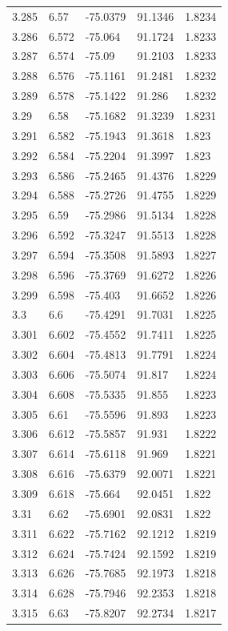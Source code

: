 \begin{tabular}{lllll}
3.285 & 6.57 & -75.0379 & 91.1346 & 1.8234 \\
3.286 & 6.572 & -75.064 & 91.1724 & 1.8233 \\
3.287 & 6.574 & -75.09 & 91.2103 & 1.8233 \\
3.288 & 6.576 & -75.1161 & 91.2481 & 1.8232 \\
3.289 & 6.578 & -75.1422 & 91.286 & 1.8232 \\
3.29 & 6.58 & -75.1682 & 91.3239 & 1.8231 \\
3.291 & 6.582 & -75.1943 & 91.3618 & 1.823 \\
3.292 & 6.584 & -75.2204 & 91.3997 & 1.823 \\
3.293 & 6.586 & -75.2465 & 91.4376 & 1.8229 \\
3.294 & 6.588 & -75.2726 & 91.4755 & 1.8229 \\
3.295 & 6.59 & -75.2986 & 91.5134 & 1.8228 \\
3.296 & 6.592 & -75.3247 & 91.5513 & 1.8228 \\
3.297 & 6.594 & -75.3508 & 91.5893 & 1.8227 \\
3.298 & 6.596 & -75.3769 & 91.6272 & 1.8226 \\
3.299 & 6.598 & -75.403 & 91.6652 & 1.8226 \\
3.3 & 6.6 & -75.4291 & 91.7031 & 1.8225 \\
3.301 & 6.602 & -75.4552 & 91.7411 & 1.8225 \\
3.302 & 6.604 & -75.4813 & 91.7791 & 1.8224 \\
3.303 & 6.606 & -75.5074 & 91.817 & 1.8224 \\
3.304 & 6.608 & -75.5335 & 91.855 & 1.8223 \\
3.305 & 6.61 & -75.5596 & 91.893 & 1.8223 \\
3.306 & 6.612 & -75.5857 & 91.931 & 1.8222 \\
3.307 & 6.614 & -75.6118 & 91.969 & 1.8221 \\
3.308 & 6.616 & -75.6379 & 92.0071 & 1.8221 \\
3.309 & 6.618 & -75.664 & 92.0451 & 1.822 \\
3.31 & 6.62 & -75.6901 & 92.0831 & 1.822 \\
3.311 & 6.622 & -75.7162 & 92.1212 & 1.8219 \\
3.312 & 6.624 & -75.7424 & 92.1592 & 1.8219 \\
3.313 & 6.626 & -75.7685 & 92.1973 & 1.8218 \\
3.314 & 6.628 & -75.7946 & 92.2353 & 1.8218 \\
3.315 & 6.63 & -75.8207 & 92.2734 & 1.8217 \\

\end{tabular}
